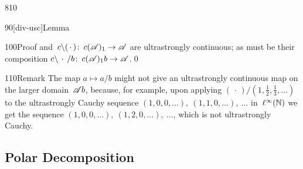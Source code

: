 \begin{parsec}{810}
\begin{point}{90}[div-usc]{Lemma}
\begin{point}{100}{Proof}
and~$c\backslash(\,\cdot\,)\colon\, c(\mathscr{A})_1\to\mathscr{A}$
are ultrastrongly continuous;
as must be their composition $c\backslash\,\cdot\,/b\colon\,
c(\mathscr{A})_1b\to\mathscr{A}$.\qed
\end{point}
\begin{point}{110}{Remark}%
The map $a\mapsto a/b$ might not give
an ultrastrongly
continuous map on the larger domain~$\mathscr{A} b$,
because, for example, 
upon applying $(\,\cdot\,)/(1,\frac{1}{2},\frac{1}{3},\dotsc)$
to the ultrastrongly Cauchy 
sequence  $(1,0,0,\dotsc),\ (1,1,0,\dotsc),\ \dotsc$
    in~$\ell^\infty(\mathbb{N})$
we get the 
sequence $(1,0,0,\dotsc),\ (1,2,0,\dotsc),\ \dotsc$,
which is not ultrastrongly Cauchy.
\end{point}
\end{point}
\end{parsec}
\subsection{Polar Decomposition}
